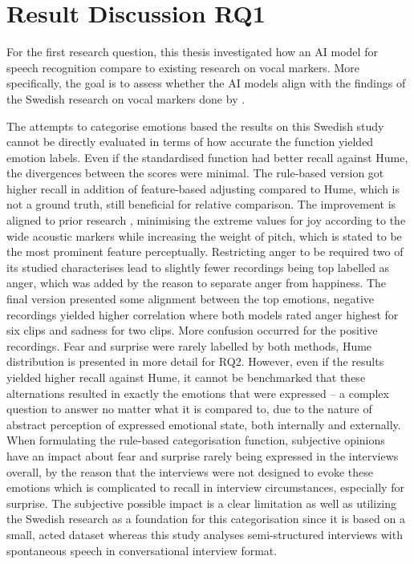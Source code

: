 \section{Result Discussion RQ1}

For the first research question, this thesis investigated how an AI model for speech recognition
compare to existing research on vocal markers. More specifically, the goal is to assess whether
the AI models align with the findings of the Swedish research on vocal markers done by \textcite{Ekberg2023}. 

The attempts to categorise emotions based the results on this Swedish study cannot be directly evaluated in terms of how accurate the function yielded emotion labels. Even if the standardised function had better recall against Hume, the divergences between the scores were minimal. 
The rule-based version got higher recall in addition of feature-based adjusting compared to Hume, which is not a ground truth, still beneficial for relative comparison. 
The improvement is aligned to prior research \autocites{Banse1996}{Ekberg2023}, minimising the extreme values for joy according to the wide acoustic markers while increasing the weight of pitch, which is stated to be the most prominent feature perceptually. 
Restricting anger to be required two of its studied characterises lead to slightly fewer recordings being top labelled as anger, which was added by the reason to separate anger from happiness. The final version presented some alignment between the top emotions, negative recordings yielded higher correlation where both models rated anger highest for six clips and sadness for two clips. More confusion occurred for the positive recordings. 
Fear and surprise were rarely labelled by both methods, Hume distribution is presented in more detail for RQ2. 
However, even if the results yielded higher recall against Hume, it cannot be benchmarked that these alternations resulted in exactly the emotions that were expressed – a complex question to answer no matter what it is compared to, due to the nature of abstract perception of expressed emotional state, both internally and externally. When formulating the rule-based categorisation function, subjective opinions have an impact about fear and surprise rarely being expressed in the interviews overall, 
by the reason that the interviews were not designed to evoke these emotions which is complicated to recall in interview circumstances, especially for surprise. 
The subjective possible impact is a clear limitation as well as utilizing the Swedish research as a foundation for this categorisation since it is based on a small, acted dataset whereas this study analyses semi-structured interviews with spontaneous speech in conversational interview format. 

